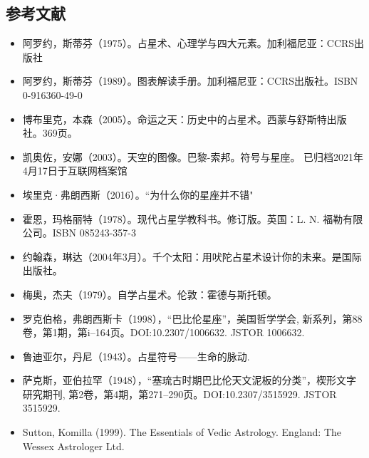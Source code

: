 \subsection{参考文献}
\begin{itemize}
\item 阿罗约，斯蒂芬（1975）。占星术、心理学与四大元素。加利福尼亚：CCRS出版社
\item 阿罗约，斯蒂芬（1989）。图表解读手册。加利福尼亚：CCRS出版社。ISBN 0-916360-49-0
\item 博布里克，本森（2005）。命运之天：历史中的占星术。西蒙与舒斯特出版社。369页。
\item 凯奥佐，安娜（2003）。天空的图像。巴黎-索邦。符号与星座。 已归档2021年4月17日于互联网档案馆
\item 埃里克·弗朗西斯（2016）。“为什么你的星座并不错"
\item 霍恩，玛格丽特（1978）。现代占星学教科书。修订版。英国：L. N. 福勒有限公司。ISBN 085243-357-3
\item 约翰森，琳达（2004年3月）。千个太阳：用吠陀占星术设计你的未来。是国际出版社。
\item 梅奥，杰夫（1979）。自学占星术。伦敦：霍德与斯托顿。
\item 罗克伯格，弗朗西斯卡（1998），“巴比伦星座”，美国哲学学会, 新系列，第88卷，第1期，第i–164页。DOI:10.2307/1006632. JSTOR 1006632.
\item 鲁迪亚尔，丹尼（1943）。占星符号——生命的脉动.
\item 萨克斯，亚伯拉罕（1948），“塞琉古时期巴比伦天文泥板的分类”，楔形文字研究期刊, 第2卷，第4期，第271–290页。DOI:10.2307/3515929. JSTOR 3515929.
\item Sutton, Komilla (1999). The Essentials of Vedic Astrology. England: The Wessex Astrologer Ltd.
\end{itemize}